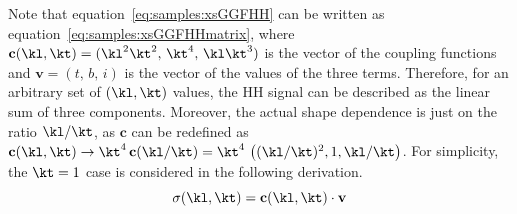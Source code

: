 Note that equation~\ref{eq:samples:xsGGFHH} can be written as equation~\ref{eq:samples:xsGGFHHmatrix}, where $\mathbf{c}(\kl, \kt)  = (\kl^2\kt^2, \, \kt^4, \, \kl\kt^3)$ is the vector of the coupling functions and $\mathbf{v} = (\mathit{t}, \, \mathit{b}, \, \mathit{i})$ is the vector of the values of the three terms. Therefore, for an arbitrary set of $(\kl, \kt)$ values, the HH signal can be described as the linear sum of three components. Moreover, the actual shape dependence is just on the ratio $\kl/\kt$, as $\mathbf{c}$ can be redefined as $\mathbf{c}(\kl, \kt) \rightarrow \kt^4 \, \mathbf{c}(\kl/\kt) = \kt^4 \, \left( (\kl/\kt)^2, 1, \kl/\kt \right)$. For simplicity, the $\kt = 1$ case is considered in the following derivation.
\begin{equation}
\label{eq:samples:xsGGFHHmatrix}
\sigma(\kl, \kt) = \mathbf{c}(\kl, \kt) \cdot \mathbf{v}
\end{equation}

